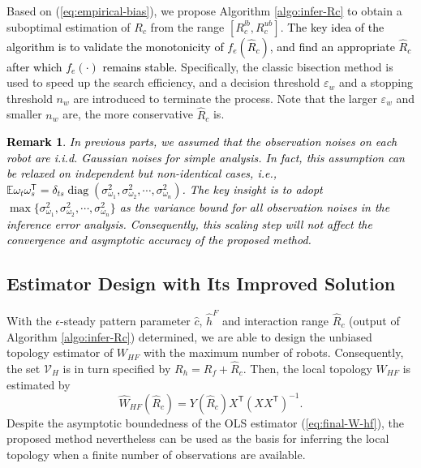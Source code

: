\documentclass[12pt,journal,draftclsnofoot,onecolumn]{IEEEtran}
\newtheorem{remark}{Remark}
\let \sss=\scriptscriptstyle
\begin{document}
Based on (\ref{eq:empirical-bias}), we propose Algorithm \ref{algo:infer-Rc} to obtain a suboptimal estimation of ${R}_c$ from the range $[R_c^{lb},R_c^{ub}]$. 
\textcolor{black}{The key idea of the algorithm is to validate the monotonicity of $f_e(\hat{R}_c)$, and find an appropriate $\hat{R}_c$ after which $f_e(\cdot)$ remains stable. }
Specifically, the classic bisection method is used to speed up the search efficiency, and a decision threshold $\varepsilon_w$ and a stopping threshold $n_w$ are introduced to terminate the process. 
Note that the larger $\varepsilon_w$ and smaller $n_w$ are, the more conservative $\hat{R}_c$ is.

\textcolor{black}{
\begin{remark}
In previous parts, we assumed that the observation noises on each robot are i.i.d. Gaussian noises for simple analysis.  
In fact, this assumption can be relaxed on independent but non-identical cases, i.e., $\mathbb{E} \omega_t \omega_s^{\mathsf{T}}=\delta_{ts}\operatorname{diag}(\sigma_{\omega_1}^2, \sigma_{\omega_2}^2,\cdots,\sigma_{\omega_n}^2)$.  
The key insight is to adopt $\max\{\sigma_{\omega_1}^2, \sigma_{\omega_2}^2,\cdots,\sigma_{\omega_n}^2\}$ as the variance bound for all observation noises in the inference error analysis. 
Consequently, this scaling step will not affect the convergence and asymptotic accuracy of the proposed method. 
\end{remark}}



\subsection{Estimator Design with Its Improved Solution}
With the $\epsilon$-steady pattern parameter $\hat c$, $\hat{h}^{\sss F}$ and interaction range $\hat R_c$ (output of Algorithm \ref{algo:infer-Rc}) determined, we are able to design the unbiased topology estimator of $W_{\sss HF}$ with the maximum number of robots. 
Consequently, the set $\mathcal{V}_{\sss H}$ is in turn specified by $R_{h}=R_{f}+\hat R_{c}$. 
Then, the local topology $W_{\sss HF}$ is estimated by 
\begin{equation}\label{eq:final-W-hf}
\hat W_{\sss{HF}}(\hat R_{c}) = Y(\hat R_c) X^\mathsf{T} ( X X^\mathsf{T})^{-1}. 
\end{equation}
Despite the asymptotic boundedness of the OLS estimator (\ref{eq:final-W-hf}), the proposed method nevertheless can be used as the basis for inferring the local topology when a finite number of observations are available. 
\end{document}
